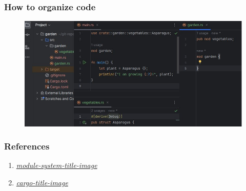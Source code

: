 \documentclass{beamer}
\begin{document}
\begin{frame}
    \frametitle{How to organize code}
\begin{figure}
    \centering
    \includegraphics[width=0.9\linewidth]{images/modules-example}
\end{figure}
\end{frame}

\begin{frame}
    \frametitle{References}
    \begin{enumerate}
        \item \href{https://media.dev.to/cdn-cgi/image/width=1000,height=420,fit=cover,gravity=auto,format=auto/https\%3A\%2F\%2Fdev-to-uploads.s3.amazonaws.com\%2Fi\%2Fvd28y0mx3grcgrfduwkd.jpg}{\textit{module-system-title-image}}
        \item \href{https://jfrog.com/devops-tools/article/how-to-run-a-private-cargo-registry/}{\textit{cargo-title-image}}
    \end{enumerate}
\end{frame}
\end{document}
